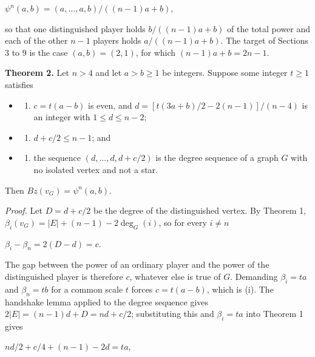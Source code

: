 \documentclass[
]{article}
\providecommand{\tightlist}{%
  \setlength{\itemsep}{0pt}\setlength{\parskip}{0pt}}
\begin{document}
\(\psi^n(a,b) = (a,\dots,a,b)/((n-1)a + b)\),

so that one distinguished player holds \(b/((n-1)a+b)\) of the total
power and each of the other \(n-1\) players holds \(a/((n-1)a+b)\). The
target of Sections 3 to 9 is the case \((a,b) = (2,1)\), for which
\((n-1)a + b = 2n-1\).

\textbf{Theorem 2.} Let \(n > 4\) and let \(a > b \ge 1\) be integers.
Suppose some integer \(t \ge 1\) satisfies

\begin{itemize}
\tightlist
\item
  \begin{enumerate}
  \def\labelenumi{(\roman{enumi})}
  \tightlist
  \item
    \(c = t(a-b)\) is even, and \(d = [t(3a+b)/2 - 2(n-1)]/(n-4)\) is an
    integer with \(1 \le d \le n-2\);
  \end{enumerate}
\item
  \begin{enumerate}
  \def\labelenumi{(\roman{enumi})}
  \setcounter{enumi}{1}
  \tightlist
  \item
    \(d + c/2 \le n-1\); and
  \end{enumerate}
\item
  \begin{enumerate}
  \def\labelenumi{(\roman{enumi})}
  \setcounter{enumi}{2}
  \tightlist
  \item
    the sequence \((d,\dots,d,d+c/2)\) is the degree sequence of a graph
    \(G\) with no isolated vertex and not a star.
  \end{enumerate}
\end{itemize}

Then \(Bz(v_G) = \psi^n(a,b)\).

\emph{Proof.} Let \(D = d + c/2\) be the degree of the distinguished
vertex. By Theorem 1, \(\beta_i(v_G) = |E| + (n-1) - 2\deg_G(i)\), so
for every \(i \ne n\)

\(\beta_i - \beta_n = 2(D - d) = c\).

The gap between the power of an ordinary player and the power of the
distinguished player is therefore \(c\), whatever else is true of \(G\).
Demanding \(\beta_i = ta\) and \(\beta_n = tb\) for a common scale \(t\)
forces \(c = t(a-b)\), which is (i). The handshake lemma applied to the
degree sequence gives \(2|E| = (n-1)d + D = nd + c/2\); substituting
this and \(\beta_i = ta\) into Theorem 1 gives

\(nd/2 + c/4 + (n-1) - 2d = ta\),
\end{document}
